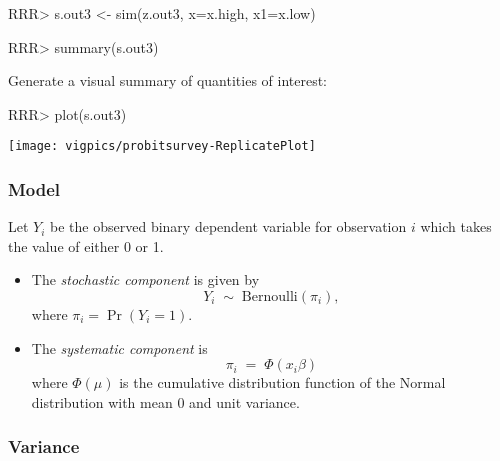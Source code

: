 \begin{enumerate}
\begin{Schunk}
\begin{Sinput}
RRR> s.out3 <- sim(z.out3, x=x.high, x1=x.low)
\end{Sinput}
\end{Schunk}
\begin{Schunk}
\begin{Sinput}
RRR>  summary(s.out3)
\end{Sinput}
\end{Schunk}
Generate a visual summary of quantities of interest:
\begin{center}
\begin{Schunk}
\begin{Sinput}
RRR>  plot(s.out3)
\end{Sinput}
\end{Schunk}
\texttt{[image: vigpics/probitsurvey-ReplicatePlot]}
\end{center}


\end{enumerate}

\subsubsection{Model}
Let $Y_i$ be the observed binary dependent variable for observation
$i$ which takes the value of either 0 or 1.
\begin{itemize}
\item The \emph{stochastic component} is given by  
\begin{equation*}
Y_i \; \sim \; \textrm{Bernoulli}(\pi_i), 
\end{equation*}
where $\pi_i=\Pr(Y_i=1)$.

\item The \emph{systematic component} is 
\begin{equation*}
  \pi_i \; = \; \Phi (x_i \beta)
\end{equation*}
where $\Phi(\mu)$ is the cumulative distribution function of the
Normal distribution with mean 0 and unit variance.
\end{itemize}

\subsubsection{Variance}

